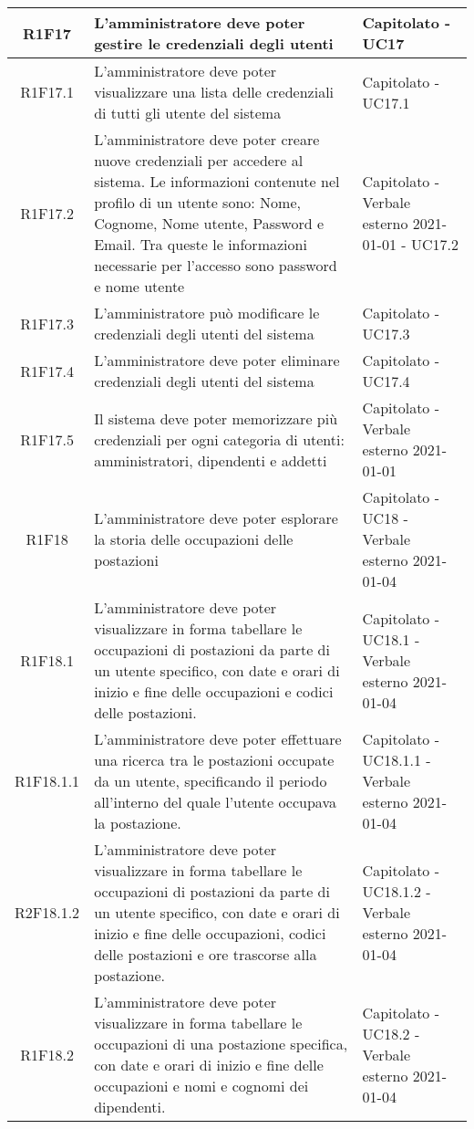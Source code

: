 \begin{center}
\begin{longtable}{|c|p{10cm}|p{4cm}|}
		R1F17&L'amministratore deve poter gestire le credenziali degli utenti	& Capitolato - UC17		\\
		\hline
		R1F17.1&L'amministratore deve poter visualizzare una lista delle credenziali di tutti gli utente del sistema	& Capitolato - UC17.1	\\
		\hline
		R1F17.2&L'amministratore deve poter creare nuove credenziali per accedere al sistema. Le informazioni contenute nel profilo di un utente sono: Nome, Cognome, Nome utente, Password e Email. Tra queste le informazioni necessarie per l'accesso sono password e nome utente	& Capitolato - Verbale esterno 2021-01-01 - UC17.2	\\
		\hline
		R1F17.3&L'amministratore può modificare le credenziali degli utenti del sistema	&Capitolato - UC17.3 	\\
		\hline
		R1F17.4&L'amministratore deve poter eliminare credenziali degli utenti del sistema	& Capitolato - UC17.4	\\
		\hline
		R1F17.5&Il sistema deve poter memorizzare più credenziali per ogni categoria di utenti: amministratori, dipendenti e addetti	& Capitolato - Verbale esterno 2021-01-01	\\
		\hline
		R1F18&L'amministratore deve poter esplorare la storia delle occupazioni delle postazioni	& Capitolato - UC18 - Verbale esterno 2021-01-04	\\
		\hline
		R1F18.1&L'amministratore deve poter visualizzare in forma tabellare le occupazioni di postazioni da parte di un utente specifico, con date e orari di inizio e fine delle occupazioni e codici delle postazioni.	&Capitolato - UC18.1 - Verbale esterno 2021-01-04	\\
		\hline
		R1F18.1.1&L'amministratore deve poter effettuare una ricerca tra le postazioni occupate da un utente, specificando il periodo all'interno del quale l'utente occupava la postazione. & 	Capitolato - UC18.1.1 - Verbale esterno 2021-01-04\\
		\hline
		R2F18.1.2&L'amministratore deve poter visualizzare in forma tabellare le occupazioni di postazioni da parte di un utente specifico, con date e orari di inizio e fine delle occupazioni,  codici delle postazioni e ore trascorse alla postazione. & 	Capitolato - UC18.1.2 - Verbale esterno 2021-01-04\\
		\hline
		R1F18.2&L'amministratore deve poter visualizzare in forma tabellare le occupazioni di una postazione specifica, con date e orari di inizio e fine delle occupazioni e nomi e cognomi dei dipendenti.	&Capitolato - UC18.2 - Verbale esterno 2021-01-04	\\

\end{longtable}
\end{center}
